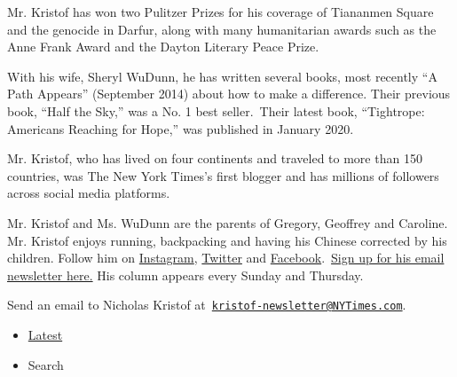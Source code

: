 Mr. Kristof has won two Pulitzer Prizes for his coverage of Tiananmen
Square and the genocide in Darfur, along with many humanitarian awards
such as the Anne Frank Award and the Dayton Literary Peace Prize.

With his wife, Sheryl WuDunn, he has written several books, most
recently ``A Path Appears'' (September 2014) about how to make a
difference. Their previous book, ``Half the Sky,'' was a No. 1 best
seller.~Their latest book, ``Tightrope: Americans Reaching for Hope,''
was published in January 2020.~

Mr. Kristof, who has lived on four continents and traveled to more than
150 countries, was The New York Times's first blogger and has millions
of followers across social media platforms.

Mr. Kristof and Ms. WuDunn are the parents of Gregory, Geoffrey and
Caroline. Mr. Kristof enjoys running, backpacking and having his Chinese
corrected by his children. Follow him on
\href{http://instagram.com/nickkristof}{Instagram},
\href{https://twitter.com/NickKristof}{Twitter} and
\href{https://www.facebookcorewwwi.onion/kristof}{Facebook}.~\href{https://www.nytimes3xbfgragh.onion/newsletters/nicholas-kristof}{Sign
up for his email newsletter here.} His column appears every Sunday and
Thursday.

Send an email to Nicholas Kristof
at~\href{mailto:kristof-newsletter@NYTimes.com}{\nolinkurl{kristof-newsletter@NYTimes.com}}.

\begin{itemize}
\tightlist
\item
  \protect\hyperlink{stream-panel}{Latest}
\item
  Search
\end{itemize}

